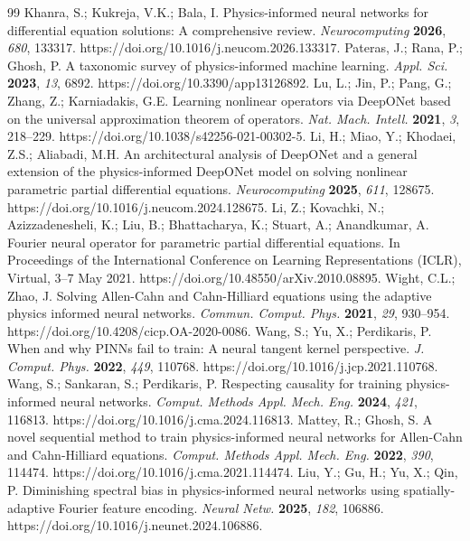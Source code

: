\begin{thebibliography}{99}
 Khanra, S.; Kukreja, V.K.; Bala, I. Physics-informed neural networks for differential equation solutions: A comprehensive review. \textit{Neurocomputing} \textbf{2026}, \textit{680}, 133317. https://doi.org/10.1016/j.neucom.2026.133317.
 Pateras, J.; Rana, P.; Ghosh, P. A taxonomic survey of physics-informed machine learning. \textit{Appl. Sci.} \textbf{2023}, \textit{13}, 6892. https://doi.org/10.3390/app13126892.
 Lu, L.; Jin, P.; Pang, G.; Zhang, Z.; Karniadakis, G.E. Learning nonlinear operators via DeepONet based on the universal approximation theorem of operators. \textit{Nat. Mach. Intell.} \textbf{2021}, \textit{3}, 218--229. https://doi.org/10.1038/s42256-021-00302-5.
 Li, H.; Miao, Y.; Khodaei, Z.S.; Aliabadi, M.H. An architectural analysis of DeepONet and a general extension of the physics-informed DeepONet model on solving nonlinear parametric partial differential equations. \textit{Neurocomputing} \textbf{2025}, \textit{611}, 128675. https://doi.org/10.1016/j.neucom.2024.128675.
 Li, Z.; Kovachki, N.; Azizzadenesheli, K.; Liu, B.; Bhattacharya, K.; Stuart, A.; Anandkumar, A. Fourier neural operator for parametric partial differential equations. In Proceedings of the International Conference on Learning Representations (ICLR), Virtual, 3--7 May 2021. https://doi.org/10.48550/arXiv.2010.08895.
 Wight, C.L.; Zhao, J. Solving Allen-Cahn and Cahn-Hilliard equations using the adaptive physics informed neural networks. \textit{Commun. Comput. Phys.} \textbf{2021}, \textit{29}, 930--954. https://doi.org/10.4208/cicp.OA-2020-0086.
 Wang, S.; Yu, X.; Perdikaris, P. When and why PINNs fail to train: A neural tangent kernel perspective. \textit{J. Comput. Phys.} \textbf{2022}, \textit{449}, 110768. https://doi.org/10.1016/j.jcp.2021.110768.
 Wang, S.; Sankaran, S.; Perdikaris, P. Respecting causality for training physics-informed neural networks. \textit{Comput. Methods Appl. Mech. Eng.} \textbf{2024}, \textit{421}, 116813. https://doi.org/10.1016/j.cma.2024.116813.
 Mattey, R.; Ghosh, S. A novel sequential method to train physics-informed neural networks for Allen-Cahn and Cahn-Hilliard equations. \textit{Comput. Methods Appl. Mech. Eng.} \textbf{2022}, \textit{390}, 114474. https://doi.org/10.1016/j.cma.2021.114474.
 Liu, Y.; Gu, H.; Yu, X.; Qin, P. Diminishing spectral bias in physics-informed neural networks using spatially-adaptive Fourier feature encoding. \textit{Neural Netw.} \textbf{2025}, \textit{182}, 106886. https://doi.org/10.1016/j.neunet.2024.106886.

\end{thebibliography}
